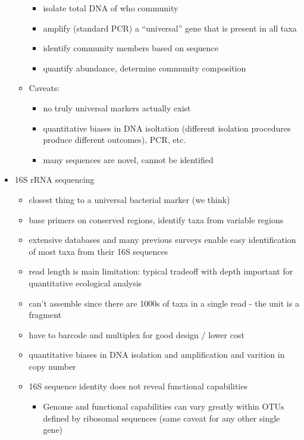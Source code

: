 \documentclass{article}
\begin{document}
\begin{itemize}
\begin{itemize}
            \begin{itemize}
                \item isolate total DNA of who community
                \item amplify (standard PCR) a ``universal'' gene that is present in all taxa
                \item identify community members based on sequence
                \item quantify abundance, determine community composition
            \end{itemize}
            \item Caveats:
            \begin{itemize}
                \item no truly universal markers actually exist
                \item quantitative biases in DNA isoltation (different isolation procedures produce different outcomes), PCR, etc.
                \item many sequences are novel, cannot be identified
            \end{itemize}
        \end{itemize}
        \item 16S rRNA sequencing
        \begin{itemize}
            \item closest thing to a universal bacterial marker (we think)
            \item base primers on conserved regions, identify taxa from variable regions
            \item extensive databases and many previous surveys enable easy identification of most taxa from their 16S sequences
            \item read length is main limitation: typical tradeoff with depth important for quantitative ecological analysis
            \item can't assemble since there are 1000s of taxa in a single read - the unit is a fragment
            \item have to barcode and multiplex for good design / lower cost
            \item quantitative biases in DNA isolation and amplification and varition in copy number
            \item 16S sequence identity does not reveal functional capabilities
            \begin{itemize}
                \item Genome and functional capabilities can vary greatly within OTUs defined by ribosomal sequences (same caveat for any other single gene)

\end{itemize}
\end{itemize}
\end{itemize}
\end{document}
